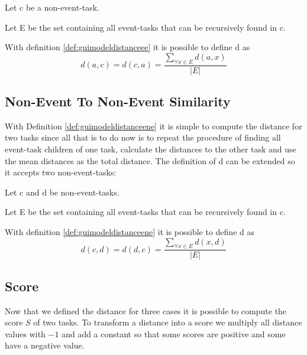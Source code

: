 \begin{definition}
	\item Let c be a non-event-task.
	\item Let E be the set containing all event-tasks that can be recursively found in c.
	\item With definition \ref{def:guimodeldistanceee} it is possible to define d as
\begin{equation*}
	d(a,c) = d(c,a) = \frac{\sum_{\forall x \in E} d(a,x)}{|E|}
\end{equation*}
\label{def:guimodeldistanceene}
\end{definition}

\subsection{Non-Event To Non-Event Similarity}
With Definition \ref{def:guimodeldistanceene} it is simple to compute the distance for two tasks since all that is to do now is to repeat the procedure of finding all event-task children of one task, calculate the distances to the other task and use the mean distances as the total distance.
The definition of d can be extended so it accepts two non-event-tasks:

\begin{definition}
	\item Let c and d be non-event-tasks.
	\item Let E be the set containing all event-tasks that can be recursively found in c.
	\item With definition \ref{def:guimodeldistanceene} it is possible to define d as
	\begin{equation*}
		d(c,d) = d(d,c) = \frac{\sum_{\forall x \in E} d(x,d)}{|E|}
	\end{equation*}
\label{def:guimodeldistancenene}
\end{definition}
\subsection{Score}
Now that we defined the distance for three cases it is possible to compute the score $S$ of two tasks.
To transform a distance into a score we multiply all distance values with $-1$ and add a constant so that some scores are positive and some have a negative value.

